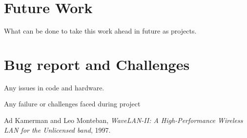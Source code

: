 \documentclass[a4paper,12pt,oneside]{book}
\begin{document}
\section{Future Work}
What can be done to take this work ahead in future as projects.

\section{Bug report and Challenges}
Any issues in code and hardware.

Any failure or challenges faced during project

\begin{thebibliography}{li}
Ad Kamerman and Leo Monteban,
{\em WaveLAN-II: A High-Performance Wireless LAN for the Unlicensed band},
1997.

\end{thebibliography}
\end{document}

